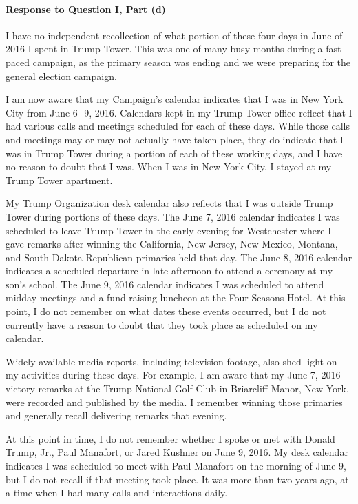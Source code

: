 \paragraph*{Response to Question I, Part (d)}

I have no independent recollection of what portion of these four days in June of 2016 I spent in Trump Tower.
This was one of many busy months during a fast-paced campaign, as the primary season was ending and we were preparing for the general election campaign.

I am now aware that my Campaign’s calendar indicates that I was in New York City from June 6 -9, 2016.
Calendars kept in my Trump Tower office reflect that I had various calls and meetings scheduled for each of these days.
While those calls and meetings may or may not actually have taken place, they do indicate that I was in Trump Tower during a portion of each of these working days, and I have no reason to doubt that I was.
When I was in New York City, I stayed at my Trump Tower apartment.

My Trump Organization desk calendar also reflects that I was outside Trump Tower during portions of these days.
The June 7, 2016 calendar indicates I was scheduled to leave Trump Tower in the early evening for Westchester where I gave remarks after winning the California, New Jersey, New Mexico, Montana, and South Dakota Republican primaries held that day.
The June 8, 2016 calendar indicates a scheduled departure in late afternoon to attend a ceremony at my son’s school.
The June 9, 2016 calendar indicates I was scheduled to attend midday meetings and a fund raising luncheon at the Four Seasons Hotel.
At this point, I do not remember on what dates these events occurred, but I do not currently have a reason to doubt that they took place as scheduled on my calendar.

Widely available media reports, including television footage, also shed light on my activities during these days.
For example, I am aware that my June 7, 2016 victory remarks at the Trump National Golf Club in Briarcliff Manor, New York, were recorded and published by the media.
I remember winning those primaries and generally recall delivering remarks that evening.

At this point in time, I do not remember whether I spoke or met with Donald Trump, Jr., Paul Manafort, or Jared Kushner on June 9, 2016.
My desk calendar indicates I was scheduled to meet with Paul Manafort on the morning of June 9, but I do not recall if that meeting took place.
It was more than two years ago, at a time when I had many calls and interactions daily.

